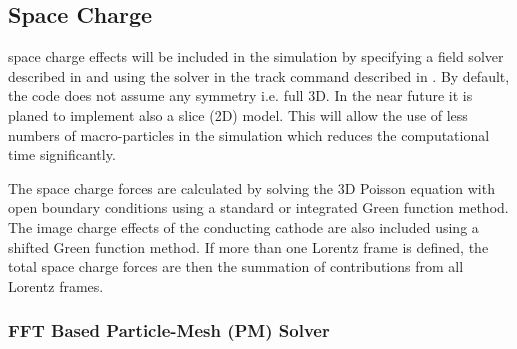 

%
%
%


\subsection{Space Charge}
\label{sec:opalFlavours:spacecharge}
space charge effects will be included in the simulation by specifying a field solver described in  and using the solver in the
track command described in .
By default, the code does not assume any symmetry i.e. full 3D. In the near future it is planed to implement also a slice (2D) model.
This will allow the use of less numbers of macro-particles in the simulation which reduces the computational time
significantly.

The space charge forces are calculated by solving the 3D Poisson equation with open boundary conditions
using a standard or integrated Green function method. The image charge effects of the conducting cathode are also
included using a shifted Green function method. If more than one Lorentz frame is defined, the total space charge forces are then the summation of contributions from all Lorentz frames. \latermore

\subsubsection{FFT Based Particle-Mesh (PM) Solver}
 \latermore

